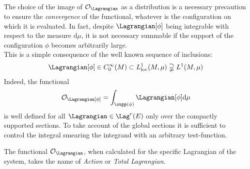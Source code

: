 \documentclass[Main]{subfiles}
\begin{document}
	
	\begin{observation}
		The choice of the image of $\mathcal{O}_\Lagrangian$ as a distribution is a necessary precaution to ensure the \emph{convergence} of the functional, whatever is the configuration on which it is evaluated.
		In fact, despite $\Lagrangian [ \phi ]$  being integrable with respect to the measure $\textrm{d}\mu$, it is not necessary summable if the support of the configuration $\phi$ becomes arbitrarily large.
		\\
		This is a simple consequence of the well known sequence of inclusions:
		\begin{displaymath}
			\Lagrangian [ \phi ] \in C^\infty_0(M) \subset L^1_{\textrm{loc}}(M,\mu) \supsetneqq  L^1(M,\mu) 
		\end{displaymath}
		Indeed, the functional
		\begin{displaymath}
			\mathcal{O}_\Lagrangian [\phi]= \int_{\supp(\phi)} \Lagrangian [\phi] \textrm{d}\mu
		\end{displaymath}
		is well defined for all $\Lagrangian \in \Lag^r(E)$ only over the compactly supported sections. 
		To take account of the global sections it is sufficient to control the integral smearing the integrand with an arbitrary test-function.
	\end{observation}
	
	\begin{notationfix}
		The functional $\mathcal{O}_\Lagrangian$, when calculated for the specific Lagrangian of the system, takes the name of \emph{Action} or \emph{Total Lagrangian}. 
	\end{notationfix}
\end{document}
